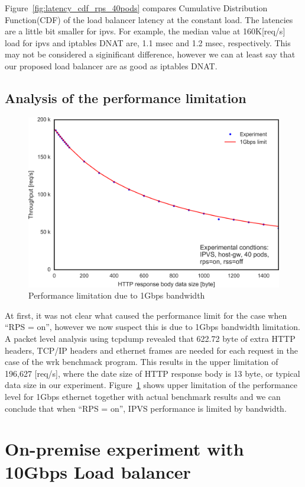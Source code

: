 Figure~\ref{fig:latency_cdf_rps_40pods} compares Cumulative Distribution Function(CDF) of the load balancer latency at the constant load.
The latencies are a little bit smaller for ipvs.
For example, the median value at 160K[req/s] load for ipvs and iptables DNAT are, 1.1 msec and 1.2 msec, respectively.
This may not be considered a siginificant difference, however we can at least say that our proposed load balancer are as good as iptables DNAT.

\subsection{Analysis of the performance limitation}

\begin{figure}
  \centering
  \includegraphics[width=0.8\columnwidth]{Figs/tp_limit_1gbps}
  \caption{Performance limitation due to 1Gbps bandwidth}
  \label{fig:performance_limitation}
\end{figure}

At first, it was not clear what caused the performance limit for the case when \enquote{RPS = on},
however we now suspect this is due to 1Gbps bandwidth limitation.
A packet level analysis using tcpdump\cite{jacobson1989tcpdump} revealed that 622.72 byte of extra HTTP headers, 
TCP/IP headers and ethernet frames are needed for each request in the case of the wrk benchmack program.  
This results in the upper limitation of 196,627 [req/s], where the date size of HTTP response body is 13 byte, or typical data size in our experiment. 
Figure~\ref{fig:performance_limitation} shows upper limitation of the performance level for 1Gbps ethernet together with 
actual benchmark results and we can conclude that when \enquote{RPS = on}, IPVS performance is limited by bandwidth.

\section{On-premise experiment with 10Gbps Load balancer}


